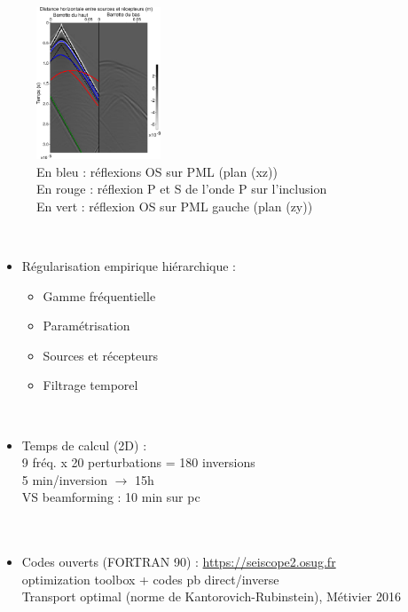 \begin{frame}{\insertsectionhead}

	\begin{figure}
		\centering
		\vspace{-1.2cm}\includegraphics[width=3.7cm]{img/data_3D/data_2freesurf.png}\\
		\tiny{En bleu : réflexions OS sur PML (plan (xz))\\
		En rouge : réflexion P et S de l'onde P sur l'inclusion\\
		En vert : réflexion OS sur PML gauche  (plan (zy))}
		\vspace{-5.3cm}
	\end{figure}~
	\begin{itemize}
		 \item Régularisation empirique hiérarchique : 
		\begin{itemize}
			\item Gamme fréquentielle
			\item Paramétrisation
			\item Sources et récepteurs
			\item Filtrage temporel
		\end{itemize}~\\
		\item Temps de calcul (2D) : \\
		9 fréq. x 20 perturbations = 180 inversions\\
		5 min/inversion $\rightarrow$ 15h\\
		VS beamforming : 10 min sur pc\\~\\~\\		
		
		\item Codes ouverts (FORTRAN 90) : \url{ https://seiscope2.osug.fr}\\
		 optimization toolbox + codes pb direct/inverse\\
		Transport optimal (norme de Kantorovich-Rubinstein), Métivier 2016
	\end{itemize}
\end{frame}


